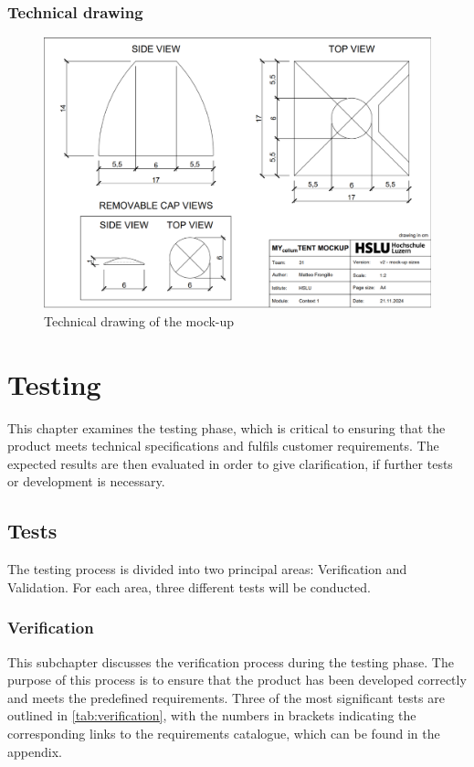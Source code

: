 \documentclass{article}
\begin{document}
\subsubsection{Technical drawing}
\begin{figure}[ht!]
    \centering
    \includegraphics[width=\textwidth]{media/tent_plane.png}
    \caption{Technical drawing of the mock-up}
    \label{fig:tent_plan}
\end{figure}

\section{Testing}
This chapter examines the testing phase, which is critical to ensuring that the product
meets technical specifications and fulfils customer requirements. The expected results are
then evaluated in order to give clarification, if further tests or development is necessary.

\subsection{Tests}
The testing process is divided into two principal areas: Verification and Validation.
For each area, three different tests will be conducted.

\subsubsection{Verification}
This subchapter discusses the verification process during the testing phase. The purpose
of this process is to ensure that the product has been developed correctly and meets the
predefined requirements. Three of the most significant tests are outlined in 
\autoref{tab:verification}, with the numbers in brackets indicating the
corresponding links to the requirements catalogue, which can be found in the appendix.
\end{document}
